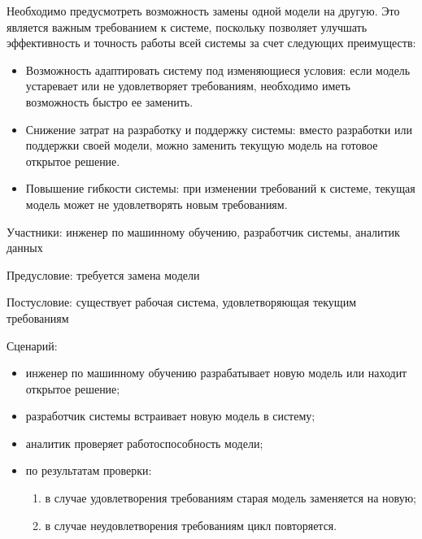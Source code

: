 Необходимо предусмотреть возможность замены одной модели на другую. Это является важным требованием к системе, поскольку позволяет улучшать эффективность и точность работы всей системы за счет следующих преимуществ:
\begin{itemize}
    \item Возможность адаптировать систему под изменяющиеся условия: если модель устаревает или не удовлетворяет требованиям, необходимо иметь возможность быстро ее заменить.
    \item Снижение затрат на разработку и поддержку системы: вместо разработки или поддержки своей модели, можно заменить текущую модель на готовое открытое решение.
    \item Повышение гибкости системы: при изменении требований к системе, текущая модель может не удовлетворять новым требованиям.
\end{itemize}

Участники: инженер по машинному обучению, разработчик системы, аналитик данных

Предусловие: требуется замена модели

Постусловие: существует рабочая система, удовлетворяющая текущим требованиям

Сценарий:
\begin{itemize}
    \item инженер по машинному обучению разрабатывает новую модель или находит открытое решение;
    \item разработчик системы встраивает новую модель в систему;
    \item аналитик проверяет работоспособность модели;
    \item по результатам проверки:
        \begin{enumerate}
            \item в случае удовлетворения требованиям старая модель заменяется на новую;
            \item в случае неудовлетворения требованиям цикл повторяется.
        \end{enumerate}
\end{itemize}
